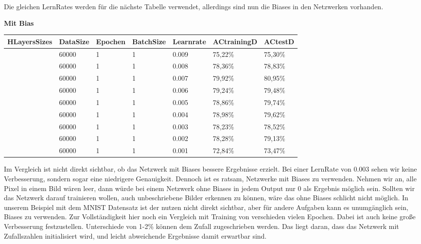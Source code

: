 \documentclass[12pt]{article}
\begin{document}
Die gleichen LernRates werden für die nächste Tabelle verwendet, allerdings sind nun die Biases in den Netzwerken vorhanden.

\begin{table}[H]
	\textbf{Mit Bias}
    \centering
    \begin{tabular}{|l|l|l|l|l|l|l|}
    \hline
        HLayersSizes & DataSize & Epochen & BatchSize & Learnrate & ACtrainingD & ACtestD \\ \hline
        [784, 100, 10] & 60000 & 1 & 1 & 0.009 & 75,22\% & 75,30\% \\ \hline
        [784, 100, 10] & 60000 & 1 & 1 & 0.008 & 78,36\% & 78,83\% \\ \hline
        [784, 100, 10] & 60000 & 1 & 1 & 0.007 & 79,92\% & 80,95\% \\ \hline
        [784, 100, 10] & 60000 & 1 & 1 & 0.006 & 79,24\% & 79,48\% \\ \hline
        [784, 100, 10] & 60000 & 1 & 1 & 0.005 & 78,86\% & 79,74\% \\ \hline
        [784, 100, 10] & 60000 & 1 & 1 & 0.004 & 78,98\% & 79,62\% \\ \hline
        [784, 100, 10] & 60000 & 1 & 1 & 0.003 & 78,23\% & 78,52\% \\ \hline
        [784, 100, 10] & 60000 & 1 & 1 & 0.002 & 78,28\% & 79,13\% \\ \hline
        [784, 100, 10] & 60000 & 1 & 1 & 0.001 & 72,84\% & 73,47\% \\ \hline
    \end{tabular}
\end{table}
Im Vergleich ist nicht direkt sichtbar, ob das Netzwerk mit Biases bessere Ergebnisse erzielt. Bei einer LernRate von 0.003 sehen wir keine Verbesserung, sondern sogar eine niedrigere Genauigkeit.
Dennoch ist es ratsam, Netzwerke mit Biases zu verwenden. Nehmen wir an, alle Pixel in einem Bild wären leer, dann würde bei einem Netzwerk ohne Biases in jedem Output nur 0 als Ergebnis möglich sein. Sollten wir das Netzwerk darauf trainieren wollen, auch unbeschriebene Bilder erkennen zu können, wäre das ohne Biases schlicht nicht möglich. In unserem Beispiel mit dem MNIST Datensatz ist der nutzen nicht direkt sichtbar, aber für andere Aufgaben kann es unumgänglich sein, Biases zu verwenden.
Zur Vollständigkeit hier noch ein Vergleich mit Training von verschieden vielen Epochen. Dabei ist auch keine große Verbesserung festzustellen. Unterschiede von 1-2\% können dem Zufall zugeschrieben werden. Das liegt daran, dass das Netzwerk mit Zufallszahlen initialisiert wird, und leicht abweichende Ergebnisse damit erwartbar sind. 
\end{document}
